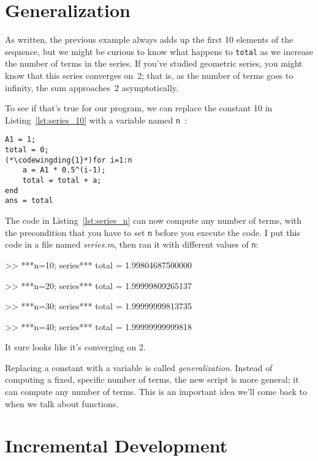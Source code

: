 \section{Generalization}


As written, the previous example always adds up the first 10
elements of the sequence, but we might be curious to know what
happens to \lstinline{total} as we increase the
number of terms in the series.  If you've studied geometric
series, you might know that this series converges on~2; that is,
as the number of terms goes to infinity, the sum approaches~2 asymptotically.

To see if that's true for our program, we can replace the
constant 10 in Listing~\ref{lst:series_10} with a variable named \lstinline{n}~:

\begin{lstlisting}[caption={Updating our code from Listing~\ref{lst:series_10} to have a variable number of terms}, label={lst:series_n}]
A1 = 1;
total = 0;
(*\codewingding{1}*)for i=1:n
    a = A1 * 0.5^(i-1);
    total = total + a;
end
ans = total
\end{lstlisting}

The code in Listing~\ref{lst:series_n} can now compute any number of terms, with the
precondition that you have to set \lstinline{n} before you execute
the code.  
I put this code in a file named {\em series.m}, then
ran it with different values of \lstinline{n}:

\begin{code}
>> ***n=10; series***
total = 1.99804687500000

>> ***n=20; series***
total = 1.99999809265137

>> ***n=30; series***
total = 1.99999999813735

>> ***n=40; series***
total = 1.99999999999818
\end{code}

It sure looks like it's converging on 2.

Replacing a constant with a variable is called \emph{generalization}.
Instead of computing a fixed, specific number of terms, the new script
is more general; it can compute any number of terms.
This is an important idea we'll come back to when we talk about functions.

\section{Incremental Development}

